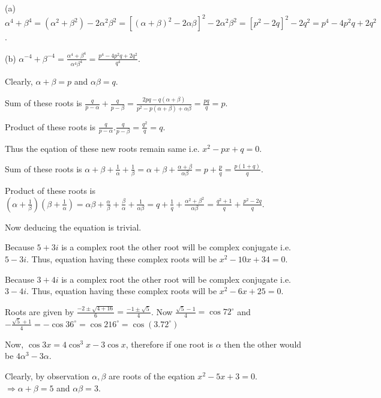   (a) $\alpha^4 + \beta^4 = (\alpha^2 + \beta^2) - 2\alpha^2\beta^2 = [(\alpha + \beta)^2 - 2\alpha\beta]^2
  - 2\alpha^2\beta^2 = [p^2 - 2q]^2 - 2q^2 = p^4 - 4p^2q + 2q^2$.

  (b) $\alpha^{-4} + \beta^{-4} = \frac{\alpha^4 + \beta^4}{\alpha^4\beta^4} = \frac{p^4 - 4p^2q +
    2q^2}{q^4}$.
\item Clearly, $\alpha + \beta = p$ and $\alpha\beta = q$.
  \startitemize[i]
  \item Sum of these roots is $\frac{q}{p - \alpha} + \frac{q}{p - \beta} = \frac{2pq - q(\alpha +
    \beta)}{p^2 - p(\alpha + \beta) + \alpha\beta} = \frac{pq}{q} = p$.

    Product of these roots is $\frac{q}{p - \alpha}.\frac{q}{p - \beta} = \frac{q^2}{q} = q$.

    Thus the eqation of these new roots remain same i.e. $x^2 - px + q = 0$.
  \item Sum of these roots is $\alpha + \beta + \frac{1}{\alpha} + \frac{1}{\beta} = \alpha + \beta +
    \frac{\alpha + \beta}{\alpha\beta} = p + \frac{p}{q} = \frac{p(1 + q)}{q}$.

    Product of these roots is $\left(\alpha + \frac{1}{\beta}\right)\left(\beta + \frac{1}{\alpha}\right) =
    \alpha\beta + \frac{\alpha}{\beta} + \frac{\beta}{\alpha} + \frac{1}{\alpha\beta} = q + \frac{1}{q} +
    \frac{\alpha^2 + \beta^2}{\alpha\beta} = \frac{q^2 + 1}{q} + \frac{p^2 - 2q}{q}$.

    Now deducing the equation is trivial.
  \stopitemize
\item Because $5 + 3i$ is a complex root the other root will be complex conjugate i.e. $5 - 3i$. Thus,
  equation having these complex roots will be $x^2 - 10x + 34 = 0$.
\item Because $3 + 4i$ is a complex root the other root will be complex conjugate i.e. $3 - 4i$. Thus,
  equation having these complex roots will be $x^2 - 6x + 25 = 0$.
\item Roots are given by $\frac{-2\pm\sqrt{4 + 16}}{6} = \frac{-1\pm\sqrt{5}}{4}$. Now $\frac{\sqrt{5} -
  1}{4} = \cos72^\circ$ and $-\frac{\sqrt{5} + 1}{4} = -\cos36^\circ = \cos216^\circ = \cos(3.72^\circ)$

  Now, $\cos3x = 4\cos^3x - 3\cos x$, therefore if one root is $\alpha$ then the other would be $4\alpha^3 -
  3\alpha$.
\item Clearly, by observation $\alpha, \beta$ are roots of the eqation $x^2 - 5x + 3 = 0$. $\Rightarrow
  \alpha + \beta = 5$ and $\alpha\beta = 3$.

